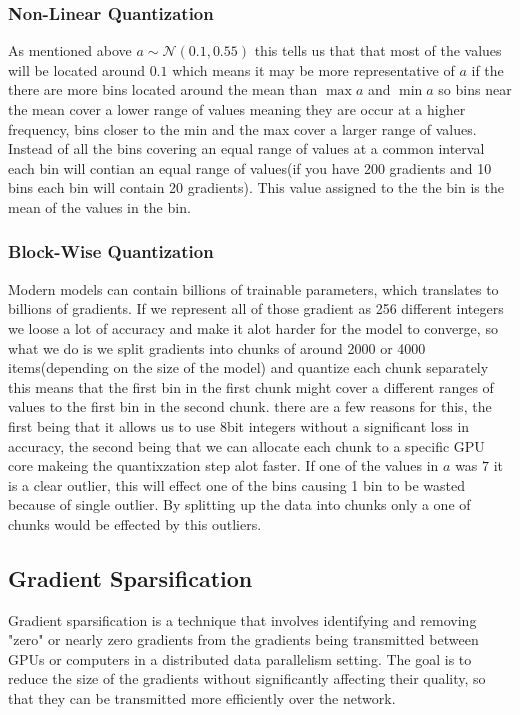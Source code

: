 \documentclass[11pt]{article}
\begin{document}
\subsubsection{Non-Linear Quantization}

As mentioned above $a \sim \mathcal{N}(0.1,0.55)$ this tells us that that most of the values will be located around $0.1$ which means it may be more representative of $a$ if the there are more bins located around the mean than $\max a$ and $\min a$ so bins near the mean cover a lower range of values meaning they are occur at a higher frequency, bins closer to the min and the max cover a larger range of values. Instead of all the bins covering an equal range of values at a common interval each bin will contian an equal range of values(if you have 200 gradients and 10 bins each bin will contain 20 gradients). This value assigned to the the bin is the mean of the values in the bin.

\subsubsection{Block-Wise Quantization}

Modern models can contain billions of trainable parameters, which translates to billions of gradients. If we represent all of those gradient as 256 different integers we loose a lot of accuracy and make it alot harder for the model to converge, so what we do is we split gradients into chunks of around 2000 or 4000 items(depending on the size of the model) and quantize each chunk separately this means that the first bin in the first chunk might cover a different ranges of values to the first bin in the second chunk. there are a few reasons for this, the first being that it allows us to use 8bit integers without a significant loss in accuracy, the second being that we can allocate each chunk to a specific GPU core makeing the quantixzation step alot faster. If one of the values in $a$ was $7$ it is a clear outlier, this will effect one of the bins causing 1 bin to be wasted because of single outlier. By splitting up the data into chunks only a one of chunks would be effected by this outliers.


\subsection{Gradient Sparsification}
Gradient sparsification is a technique that involves identifying and removing "zero" or nearly zero gradients from the gradients being transmitted between GPUs or computers in a distributed data parallelism setting. The goal is to reduce the size of the gradients without significantly affecting their quality, so that they can be transmitted more efficiently over the network.
\end{document}
